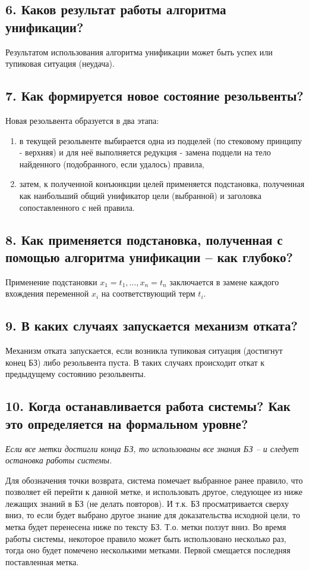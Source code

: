 \documentclass[a4paper,12pt]{article}
\begin{document}
\subsection*{6.	Каков  результат работы алгоритма унификации? }

Результатом использования алгоритма унификации может быть успех или тупиковая ситуация (неудача).

\subsection*{7.	Как формируется новое состояние резольвенты?}

Новая резольвента образуется в два этапа:
\begin{enumerate}
	\item в текущей резольвенте выбирается одна из подцелей (по стековому принципу - верхняя) и для неё выполняется редукция - замена подцели на тело найденного (подобранного, если удалось) правила,
	\item затем, к полученной конъюнкции целей применяется подстановка, полученная как наибольший общий унификатор цели (выбранной) и заголовка сопоставленного с ней правила.
\end{enumerate}

\subsection*{8.	Как применяется подстановка, полученная с помощью алгоритма унификации – как глубоко?}

Применение подстановки ${x_1=t_1, …, x_n=t_n}$ заключается в замене каждого вхождения переменной $x_i$ на соответствующий терм $t_i$.

\subsection*{9.	В каких случаях запускается механизм отката? }

Механизм отката запускается, если возникла тупиковая ситуация (достигнут конец БЗ) либо резольвента пуста. В таких случаях происходит откат к предыдущему состоянию резольвенты.

\subsection*{10. Когда останавливается работа системы? Как это определяется на формальном уровне?}

\textit{Если все метки достигли конца БЗ, то использованы все знания БЗ – и следует остановка работы системы.}

Для обозначения точки возврата, система помечает выбранное ранее правило, что позволяет ей перейти к данной метке, и использовать другое, следующее из ниже лежащих знаний в БЗ (не делать повторов). И т.к. БЗ просматривается сверху вниз, то если будет выбрано другое знание для доказательства исходной цели, то метка будет перенесена ниже по тексту БЗ. Т.о. метки ползут вниз. Во время работы системы, некоторое правило может быть использовано несколько раз, тогда оно будет помечено несколькими метками. Первой смещается последняя поставленная метка. 
	
\end{document}
